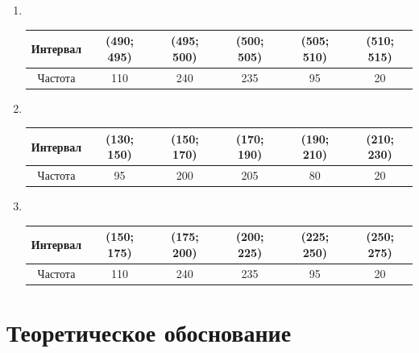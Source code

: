 \documentclass[12pt,a4paper]{article}
\begin{document}
\begin{enumerate}
		\vspace{4em}

		\item \

		\begin{table}[htbp!]
			\centering
			\begin{tabular}{ |c|c|c|c|c|c| }
				\hline
				Интервал & (490; 495) & (495; 500) & (500; 505) & (505; 510) & (510; 515) \\
				\hline
				Частота & 110 & 240 & 235 & 95 & 20 \\
				\hline
			\end{tabular}
		\end{table}

		\vspace{4em}

		\item \

		\begin{table}[htbp!]
			\centering
			\begin{tabular}{ |c|c|c|c|c|c| }
				\hline
				Интервал & (130; 150) & (150; 170) & (170; 190) & (190; 210) & (210; 230) \\
				\hline
				Частота & 95 & 200 & 205 & 80 & 20 \\
				\hline
			\end{tabular}
		\end{table}

		\vspace{4em}

		\item \

		\begin{table}[htbp!]
			\centering
			\begin{tabular}{ |c|c|c|c|c|c| }
				\hline
				Интервал & (150; 175) & (175; 200) & (200; 225) & (225; 250) & (250; 275) \\
				\hline
				Частота & 110 & 240 & 235 & 95 & 20 \\
				\hline
			\end{tabular}
		\end{table}

		\vspace{4em}
	\end{enumerate}


	\section{Теоретическое обоснование}
\end{document}
